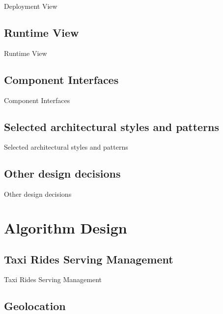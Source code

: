 \documentclass{../common/latex_classes/pdf_presentation}
\begin{document}
	\begin{frame}{Deployment View}
	\end{frame}
	
	\subsection{Runtime View}
		
	\begin{frame}{Runtime View}
	\end{frame}
	
	\subsection{Component Interfaces}
		
	\begin{frame}{Component Interfaces}
	\end{frame}
	
	\subsection{Selected architectural styles and patterns}
	
	\begin{frame}{Selected architectural styles and patterns}
	\end{frame}
	
	\subsection{Other design decisions}
		
	\begin{frame}{Other design decisions}
	\end{frame}
	
	\section{Algorithm Design}
	
	\subsection{Taxi Rides Serving Management}
	
	\begin{frame}{Taxi Rides Serving Management}
	\end{frame}
	
	\subsection{Geolocation}
	
\end{document}
